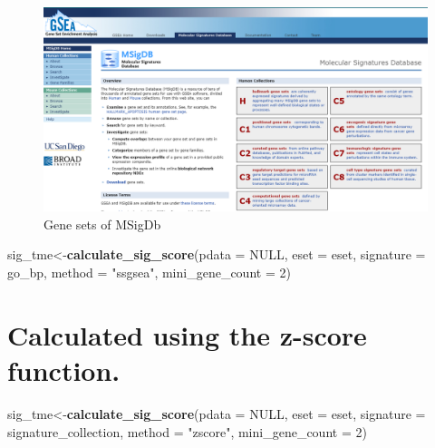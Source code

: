 \documentclass[
  12pt,
]{book}
\newenvironment{Shaded}{\begin{snugshade}}{\end{snugshade}}
\newcommand{\AttributeTok}[1]{\textcolor[rgb]{0.13,0.29,0.53}{#1}}
\newcommand{\ConstantTok}[1]{\textcolor[rgb]{0.56,0.35,0.01}{#1}}
\newcommand{\DecValTok}[1]{\textcolor[rgb]{0.00,0.00,0.81}{#1}}
\newcommand{\FunctionTok}[1]{\textcolor[rgb]{0.13,0.29,0.53}{\textbf{#1}}}
\newcommand{\NormalTok}[1]{#1}
\newcommand{\OtherTok}[1]{\textcolor[rgb]{0.56,0.35,0.01}{#1}}
\newcommand{\StringTok}[1]{\textcolor[rgb]{0.31,0.60,0.02}{#1}}
\begin{document}
\begin{figure}

{\centering \includegraphics[width=0.95\linewidth]{./fig/gsea} 

}

\caption{Gene sets of MSigDb}\label{fig:unnamed-chunk-10}
\end{figure}

\begin{Shaded}
\begin{Highlighting}[]
\NormalTok{sig\_tme}\OtherTok{\textless{}{-}}\FunctionTok{calculate\_sig\_score}\NormalTok{(}\AttributeTok{pdata           =} \ConstantTok{NULL}\NormalTok{,}
                             \AttributeTok{eset            =}\NormalTok{ eset,}
                             \AttributeTok{signature       =}\NormalTok{ go\_bp,}
                             \AttributeTok{method          =} \StringTok{"ssgsea"}\NormalTok{,}
                             \AttributeTok{mini\_gene\_count =} \DecValTok{2}\NormalTok{)}
\end{Highlighting}
\end{Shaded}

\hypertarget{calculated-using-the-z-score-function.}{%
\section{Calculated using the z-score function.}\label{calculated-using-the-z-score-function.}}

\begin{Shaded}
\begin{Highlighting}[]
\NormalTok{sig\_tme}\OtherTok{\textless{}{-}}\FunctionTok{calculate\_sig\_score}\NormalTok{(}\AttributeTok{pdata           =} \ConstantTok{NULL}\NormalTok{,}
                             \AttributeTok{eset            =}\NormalTok{ eset,}
                             \AttributeTok{signature       =}\NormalTok{ signature\_collection,}
                             \AttributeTok{method          =} \StringTok{"zscore"}\NormalTok{,}
                             \AttributeTok{mini\_gene\_count =} \DecValTok{2}\NormalTok{)}
\end{Highlighting}
\end{Shaded}
\end{document}
